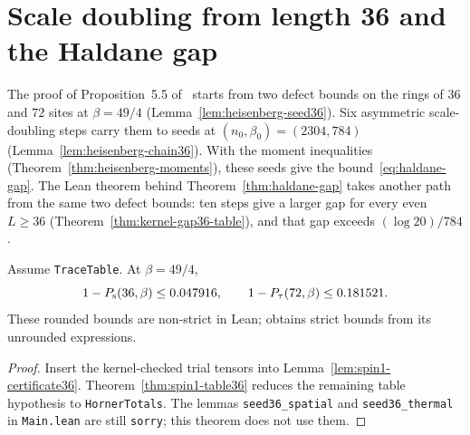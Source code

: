 \section{Scale doubling from length 36 and the Haldane gap}

The proof of Proposition~5.5 of~\cite{OpenAIHaldane} starts from two defect bounds on the rings
of \(36\) and \(72\) sites at \(\beta = 49/4\) (Lemma~\ref{lem:heisenberg-seed36}). Six asymmetric
scale-doubling steps carry them to seeds at \((n_0, \beta_0) = (2304, 784)\)
(Lemma~\ref{lem:heisenberg-chain36}). With the moment inequalities
(Theorem~\ref{thm:heisenberg-moments}), these seeds give the bound~\eqref{eq:haldane-gap}.
The Lean theorem behind Theorem~\ref{thm:haldane-gap} takes another path from the same two
defect bounds: ten steps give a larger gap for every even \(L \ge 36\)
(Theorem~\ref{thm:kernel-gap36-table}), and that gap exceeds \((\log 20)/784\).

\begin{lemma}[Initial defect bounds at \(L = 36\)]
  \label{lem:heisenberg-seed36}
  \leanok
  Assume \texttt{TraceTable}. At \(\beta = 49/4\),
  \begin{equation}
    \label{eq:heisenberg-seed36}
    1 - P_{\mathrm{s}}(36, \beta) \le 0.047916, \qquad 1 - P_{\tau}(72, \beta) \le 0.181521.
  \end{equation}
  These rounded bounds are non-strict in Lean; \cite[Section 5.3]{OpenAIHaldane} obtains
  strict bounds from its unrounded expressions.
\end{lemma}
\begin{proof}
  \leanok
  Insert the kernel-checked trial tensors into Lemma~\ref{lem:spin1-certificate36}.
  Theorem~\ref{thm:spin1-table36} reduces the remaining table hypothesis to
  \texttt{HornerTotals}. The lemmas \texttt{seed36\_spatial} and \texttt{seed36\_thermal}
  in \texttt{Main.lean} are still \texttt{sorry}; this theorem does not use them.
\end{proof}

